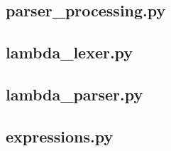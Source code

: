 \documentclass{article}
\theoremstyle{definition}
\theoremstyle{remark}
\begin{document}
\subsection{parser\_processing.py}
\begin{small}
  
\end{small}

\subsection{lambda\_lexer.py}
\begin{small}
  
\end{small}

\subsection{lambda\_parser.py}
\begin{small}
  
\end{small}

\subsection{expressions.py}
\begin{small}
  
\end{small}
\end{document}
